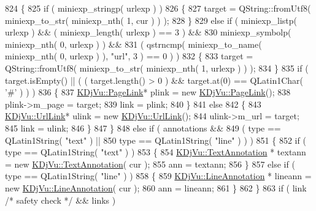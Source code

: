 \begin{DoxyCode}
824         \{
825             \textcolor{keywordflow}{if} ( miniexp\_stringp( urlexp ) )
826             \{
827                 target = QString::fromUtf8( miniexp\_to\_str( miniexp\_nth( 1, cur ) ) );
828             \}
829             \textcolor{keywordflow}{else} \textcolor{keywordflow}{if} ( miniexp\_listp( urlexp ) && ( miniexp\_length( urlexp ) == 3 ) &&
830                       miniexp\_symbolp( miniexp\_nth( 0, urlexp ) ) &&
831                       ( qstrncmp( miniexp\_to\_name( miniexp\_nth( 0, urlexp ) ), \textcolor{stringliteral}{"url"}, 3 ) == 0 ) )
832             \{
833                 target = QString::fromUtf8( miniexp\_to\_str( miniexp\_nth( 1, urlexp ) ) );
834             \}
835             \textcolor{keywordflow}{if} ( target.isEmpty() || ( ( target.length() > 0 ) && target.at(0) == QLatin1Char( \textcolor{charliteral}{'#'} ) ) )
836             \{
837                 \hyperlink{classKDjVu_1_1PageLink}{KDjVu::PageLink}* plink = \textcolor{keyword}{new} \hyperlink{classKDjVu_1_1PageLink}{KDjVu::PageLink}();
838                 plink->m\_page = target;
839                 link = plink;
840             \}
841             \textcolor{keywordflow}{else}
842             \{
843                 \hyperlink{classKDjVu_1_1UrlLink}{KDjVu::UrlLink}* ulink = \textcolor{keyword}{new} \hyperlink{classKDjVu_1_1UrlLink}{KDjVu::UrlLink}();
844                 ulink->m\_url = target;
845                 link = ulink;
846             \}
847         \}
848         \textcolor{keywordflow}{else} \textcolor{keywordflow}{if} ( annotations &&
849                   ( type == QLatin1String( \textcolor{stringliteral}{"text"} ) ||
850                     type == QLatin1String( \textcolor{stringliteral}{"line"} ) ) )
851         \{
852             \textcolor{keywordflow}{if} ( type == QLatin1String( \textcolor{stringliteral}{"text"} ) )
853             \{
854                 \hyperlink{classKDjVu_1_1TextAnnotation}{KDjVu::TextAnnotation} * textann = \textcolor{keyword}{new} 
      \hyperlink{classKDjVu_1_1TextAnnotation}{KDjVu::TextAnnotation}( cur );
855                 ann = textann;
856             \}
857             \textcolor{keywordflow}{else} \textcolor{keywordflow}{if} ( type == QLatin1String( \textcolor{stringliteral}{"line"} ) )
858             \{
859                 \hyperlink{classKDjVu_1_1LineAnnotation}{KDjVu::LineAnnotation} * lineann = \textcolor{keyword}{new} 
      \hyperlink{classKDjVu_1_1LineAnnotation}{KDjVu::LineAnnotation}( cur );
860                 ann = lineann;
861             \}
862         \}
863         \textcolor{keywordflow}{if} ( link \textcolor{comment}{/* safety check */} && links )

\end{DoxyCode}
